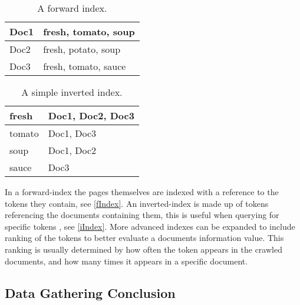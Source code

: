 \begin{minipage}{.40\textwidth}
  \centering
  \begin{table}[H]
	\centering
    \begin{tabular}{|l|l|}
\hline
Doc1 & fresh, tomato, soup \\ \hline
Doc2 & fresh, potato, soup \\ \hline
Doc3 & fresh, tomato, sauce \\ \hline
	\end{tabular}
	\caption{A forward index.}
	\label{fIndex}
  \end{table}
\end{minipage}
\begin{minipage}{0.5\textwidth}
  \centering
  \begin{table}[H]
	\centering
    \begin{tabular}{|l|l|}
\hline
fresh & Doc1, Doc2, Doc3 \\ \hline
tomato & Doc1, Doc3 \\ \hline
soup & Doc1, Doc2 \\ \hline
sauce & Doc3 \\ \hline
	\end{tabular}
	\caption{A simple inverted index.}
	\label{iIndex}
  \end{table}
\end{minipage}\nl

In a forward-index the pages themselves are indexed with a reference to the
tokens they contain, see \autoref{fIndex}. An inverted-index is made up of
tokens referencing the documents containing them, this is useful when
querying for specific tokens \citep{Index3}, see \autoref{iIndex}. More advanced
indexes can be expanded to include ranking of the tokens to better
evaluate a documents information value. This ranking is usually determined by
how often the token appears in the crawled documents, and how many times it
appears in a specific document.

\subsection{Data Gathering Conclusion}



